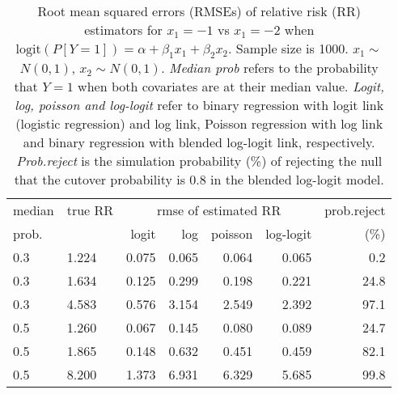 \documentclass[12pt,a4paper]{article}
\begin{document}
\begin{table}[H] 
\small\sf\centering 
\caption{Root mean squared errors (RMSEs) of relative risk (RR) estimators for $x_1=-1$ vs $x_1=-2$ when $\mbox{logit}(P[Y=1])=\alpha+\beta_1 x_1 + \beta_2 x_2$. Sample size is 1000. $x_1 \sim $$N(0,1)$, $x_2 \sim N(0,1)$. {\it Median prob} refers to the probability that $Y=1$ when both covariates are at their median value. {\it Logit, log, poisson and log-logit} refer to binary regression with logit link (logistic regression) and log link, Poisson regression with log link and binary regression with blended log-logit link, respectively. {\it Prob.reject} is the simulation probability (\%) of rejecting the null that the cutover probability is $0.8$ in the blended log-logit model.} 
\begin{tabular}{llrrrrr} 
\toprule 
median & true RR & \multicolumn{4}{c}{rmse of estimated RR} & prob.reject \\ 
prob. & & logit & log & poisson & log-logit  & (\%) \\ \midrule 
0.3 & 1.224 & 0.075 & 0.065 & 0.064 & 0.065 &  0.2 \\  
0.3 & 1.634 & 0.125 & 0.299 & 0.198 & 0.221 & 24.8 \\  
0.3 & 4.583 & 0.576 & 3.154 & 2.549 & 2.392 & 97.1 \\  
0.5 & 1.260 & 0.067 & 0.145 & 0.080 & 0.089 & 24.7 \\  
0.5 & 1.865 & 0.148 & 0.632 & 0.451 & 0.459 & 82.1 \\  
0.5 & 8.200 & 1.373 & 6.931 & 6.329 & 5.685 & 99.8 \\  
\bottomrule 
\end{tabular} 
\end{table} 
\end{document}
